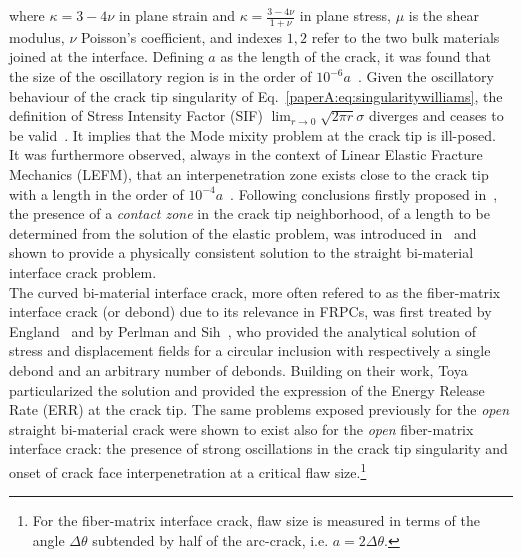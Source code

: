 where $\kappa=3-4\nu$ in plane strain and $\kappa=\frac{3-4\nu}{1+\nu}$ in plane stress, $\mu$ is the shear modulus, $\nu$ Poisson's coefficient, and indexes $1,2$ refer to the two bulk materials joined at the interface. Defining $a$ as the length of the crack, it was found that the size of the oscillatory region is in the order of $10^{-6}a$~\cite{Erdogan1963}. Given the oscillatory behaviour of the crack tip singularity of Eq.~\ref{paperA:eq:singularitywilliams}, the definition of Stress Intensity Factor (SIF) $\lim_{r\rightarrow 0}\sqrt{2\pi r}\sigma$ diverges and ceases to be valid~\cite{Comninou1990}. It implies that the Mode mixity problem at the crack tip is ill-posed.\\
It was furthermore observed, always in the context of Linear Elastic Fracture Mechanics (LEFM), that an interpenetration zone exists close to the crack tip~\cite{England1965,Malyshev1965} with a length in the order of $10^{-4}a$~\cite{England1965}. Following conclusions firstly proposed in~\cite{Malyshev1965}, the presence of a \emph{contact zone} in the crack tip neighborhood, of a length to be determined from the solution of the elastic problem, was introduced in~\cite{Comninou1977} and shown to provide a physically consistent solution to the straight bi-material interface crack problem.\\
The curved bi-material interface crack, more often refered to as the fiber-matrix interface crack (or debond) due to its relevance in FRPCs, was first treated by England~\cite{England1966} and by Perlman and Sih~\cite{Perlman1967}, who provided the analytical solution of stress and displacement fields for a circular inclusion with respectively a single debond and an arbitrary number of debonds. Building on their work, Toya~\cite{Toya1974} particularized the solution and provided the expression of the Energy Release Rate (ERR) at the crack  tip. The same problems exposed previously for the \emph{open} straight bi-material crack were shown to exist also for the \emph{open} fiber-matrix interface crack: the presence of strong oscillations in the crack tip singularity and onset of crack face interpenetration at a critical flaw size.\footnote{For the fiber-matrix interface crack, flaw size is measured in terms of the angle $\Delta\theta$ subtended by half of the arc-crack, i.e. $a=2\Delta\theta$.}\\
